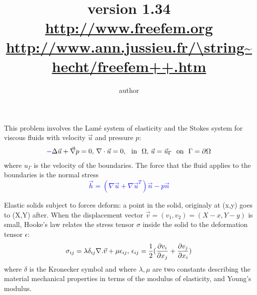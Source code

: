 \documentclass[twoside]{book}
\title{
\DeclareFixedFont{\TitreFont}{\encodingdefault}{pnc}{r}{\shapedefault}{80pt}
 {\Blue{ \TitreFont Freefem++ \\ \vglue 1cm  Manual}} \\ \vglue 5cm  ~ \\  
      \normalsize  { version 1.34  \Red{(Under construction)} }
 \\ \vglue 1cm
 \Large \url{http://www.freefem.org} \\
\url{http://www.ann.jussieu.fr/\string~hecht/freefem++.htm} 
}
\author{author}
\newif\ifpdf
\def\Blue#1{\textcolor{blue}{#1}}
\def\Black#1{\textcolor{black}{#1}}
\begin{document}
\graphicspath{{./}{plots/}}
\ifpdf
\DeclareGraphicsExtensions{.pdf, .jpg, .tif}
\else
{}
\fi
\maketitle
\tableofcontents
\let\subsubsection\subsection
\let\subsection\section
\let\section\chapter

\huge



This problem involves the Lam\'e system of elasticity
and the Stokes system for viscous fluids with velocity $\vec u$ and pressure $p$:
\begin{eqnarray*}\Blue
-\Delta \vec u +\vec\nabla p = 0, \,
\nabla\cdot \vec u = 0,\hbox{~~in ~}\Omega,\,
\vec u=\vec u_\Gamma \hbox{~~on~~}\Gamma=\partial\Omega
\end{eqnarray*}\Black
where $u_\Gamma$ is the velocity of the boundaries. The
force  that the fluid applies to the boundaries is the normal stress
\Blue{$$
\vec h =(\nabla\vec u +\nabla\vec u^T)\vec n -p\vec n
$$}

Elastic solids subject to forces deform: a point in the solid,
originaly at (x,y)
goes to (X,Y) after.  When the displacement vector
$\vec v=(v_1,v_2) = (X-x, Y-y)$  is small, Hooke's
law relates the stress tensor $\sigma$ inside the solid to the
deformation tensor $\epsilon$:
\Blue{
 $$ \sigma_{ij} = \lambda \delta_{ij} \nabla.\vec v + \mu\epsilon_{ij},
\,
\epsilon_{ij} = {1\over 2}({\partial v_i\over\partial x_j} +
{\partial v_j\over\partial x_i} )$$
}
where $\delta$ is the Kronecker symbol
and where $\lambda, \mu$ are two constants describing the material mechanical
properties in terms of the modulus of
elasticity, and Young's modulus.
\end{document}
